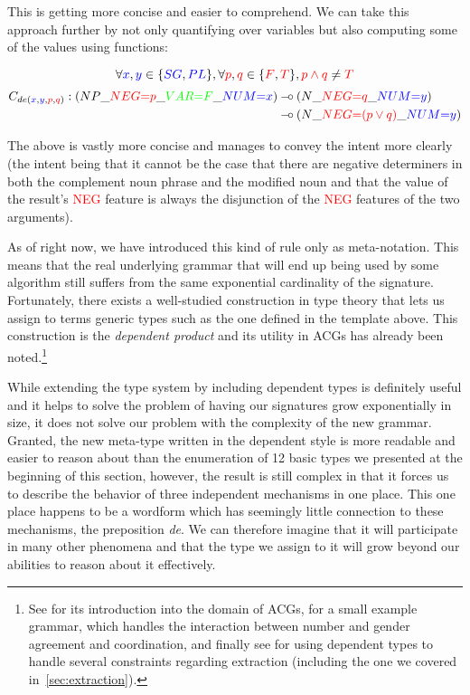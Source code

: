 This is getting more concise and easier to comprehend. We can take this
approach further by not only quantifying over variables but also
computing some of the values using functions:

$$
\forall \textcolor{blue}{x}, \textcolor{blue}{y} \in\{\textcolor{blue}{SG}, \textcolor{blue}{PL}\}, \forall \textcolor{red}{p}, \textcolor{red}{q} \in \{\textcolor{red}{F}, \textcolor{red}{T}\}, \textcolor{red}{p \land q} \neq \textcolor{red}{T}
$$
\begin{align*}
C_{de(\textcolor{blue}{x}, \textcolor{blue}{y}, \textcolor{red}{p},
  \textcolor{red}{q})} :
(NP\_\textcolor{red}{NEG{=}p}\_\textcolor{green}{VAR{=}F}\_\textcolor{blue}{NUM{=}x})
&\mathbin{{-}\mkern-3.5mu{\circ}} (N\_\textcolor{red}{NEG{=}q}\_\textcolor{blue}{NUM{=}y}) \\
&\mathbin{{-}\mkern-3.5mu{\circ}} (N\_\textcolor{red}{NEG{=}(p \lor q)}\_\textcolor{blue}{NUM{=}y})
\end{align*}

The above is vastly more concise and manages to convey the intent more
clearly (the intent being that it cannot be the case that there are
negative determiners in both the complement noun phrase and the modified
noun and that the value of the result's \textcolor{red}{NEG} feature is
always the disjunction of the \textcolor{red}{NEG} features of the two
arguments).

As of right now, we have introduced this kind of rule only as
meta-notation. This means that the real underlying grammar that will end
up being used by some algorithm still suffers from the same exponential
cardinality of the signature. Fortunately, there exists a well-studied
construction in type theory that lets us assign to terms generic types
such as the one defined in the template above. This construction is the
\emph{dependent product} and its utility in ACGs has already been
noted.\footnote{See \cite{de2007two} for its introduction into the
  domain of ACGs, \cite{de2007type} for a small example grammar, which
  handles the interaction between number and gender agreement and
  coordination, and finally see \cite{pogodalla2012controlling} for
  using dependent types to handle several constraints regarding
  extraction (including the one we covered in~\ref{sec:extraction}).}

While extending the type system by including dependent types is
definitely useful and it helps to solve the problem of having our
signatures grow exponentially in size, it does not solve our problem
with the complexity of the new grammar. Granted, the new meta-type
written in the dependent style is more readable and easier to reason
about than the enumeration of 12 basic types we presented at the
beginning of this section, however, the result is still complex in that
it forces us to describe the behavior of three independent mechanisms in
one place. This one place happens to be a wordform which has seemingly
little connection to these mechanisms, the preposition \emph{de}. We can
therefore imagine that it will participate in many other phenomena and
that the type we assign to it will grow beyond our abilities to reason
about it effectively.

